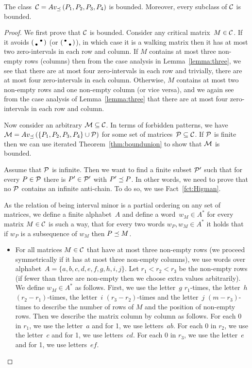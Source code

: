 \begin{thm}
The class~$\mathcal{C}=Av_{\preceq}\left(P_1,P_2,P_3,P_4\right)$ is bounded. Moreover, every subclass of $\mathcal{C}$ is bounded.
\end{thm}
\begin{proof}
We first prove that $\mathcal{C}$ is bounded. Consider any critical matrix~$M\in\mathcal{C}$. If it avoids $\left(\begin{smallmatrix} &\bullet\\\bullet& \end{smallmatrix}\right)$ (or $\left(\begin{smallmatrix}\bullet& \\ &\bullet\end{smallmatrix}\right)$), in which case it is a walking matrix then it has at most two zero-intervals in each row and column. If $M$ contains at most three non-empty rows (columns) then from the case analysis in Lemma~\ref{lemma:three}, we see that there are at most four zero-intervals in each row and trivially, there are at most four zero-intervals in each column. Otherwise, $M$ contains at most two non-empty rows and one non-empty column (or vice versa), and we again see from the case analysis of Lemma~\ref{lemma:three} that there are at most four zero-intervals in each row and column.

Now consider an arbitrary $\mathcal{M}\subseteq\mathcal{C}$. In terms of forbidden patterns, we have $\mathcal{M}=Av_{\preceq}\left(\{P_1,P_2,P_3,P_4\}\cup\mathcal{P}\right)$ for some set of matrices~$\mathcal{P}\subseteq\mathcal{C}$. If $\mathcal{P}$ is finite then we can use iterated Theorem~\ref{thm:boundunion} to show that $\mathcal{M}$ is bounded.

Assume that $\mathcal{P}$ is infinite. Then we want to find a finite subset $\mathcal{P'}$ such that for every $P\in\mathcal{P}$ there is $P'\in\mathcal{P'}$ with $P'\preceq P$. In other words, we need to prove that no $\mathcal{P}$ contains an infinite anti-chain. To do so, we use Fact~\ref{fct:Higman}.

As the relation of being interval minor is a partial ordering on any set of matrices, we define a finite alphabet~$A$ and define a word~$w_M\in A^*$ for every matrix $M\in\mathcal{C}$ is such a way, that for every two words $w_P,w_M\in A^*$ it holds that if $w_P$ is a subsequence of $w_M$ then $P\preceq M$.
\begin{itemize}
	\item For all matrices $M\in\mathcal{C}$ that have at most three non-empty rows (we proceed symmetrically if it has at most three non-empty columns), we use words over alphabet~$A=\{a,b,c,d,e,f,g,h,i,j\}$. Let $r_1<r_2<r_3$ be the non-empty rows (if fewer than three are non-empty then we choose extra values arbitrarily). We define $w_M\in A^*$ as follows. First, we use the letter~$g$ $r_1$-times, the letter~$h$ $(r_2-r_1)$-times, the letter~$i$ $(r_3-r_2)$-times and the letter~$j$ $(m-r_3)$-times to describe the number of rows of $M$ and the position of non-empty rows. Then we describe the matrix column by column as follows. For each 0 in $r_1$, we use the letter~$a$ and for 1, we use letters~$ab$. For each 0 in $r_2$, we use the letter~$c$ and for 1, we use letters~$cd$. For each 0 in $r_3$, we use the letter~$e$ and for 1, we use letters~$ef$.
		

\end{itemize}
\end{proof}
